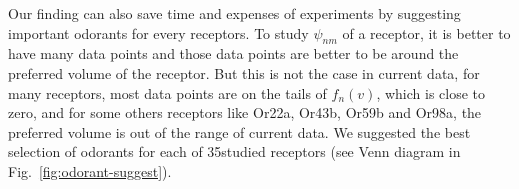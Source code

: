 \documentclass[11pt]{paper} %
\newcommand{\numberofreceptors}{35}
\begin{document}
Our finding can also save time and expenses of experiments by suggesting important odorants for every receptors.
To study $\psi_{nm}$ of a receptor, it is better to have many data points and those data points are better to be around the preferred volume of the receptor.
But this is not the case in current data, 
for many receptors, most data points are on the tails of $f_n(v)$, which is close to zero,
and for some others receptors like Or22a, Or43b, Or59b and Or98a, 
the preferred volume is out of the range of current data.
We suggested the best selection of odorants for each of \numberofreceptors studied receptors (see Venn diagram in Fig.~\ref{fig:odorant-suggest}).
\end{document}
